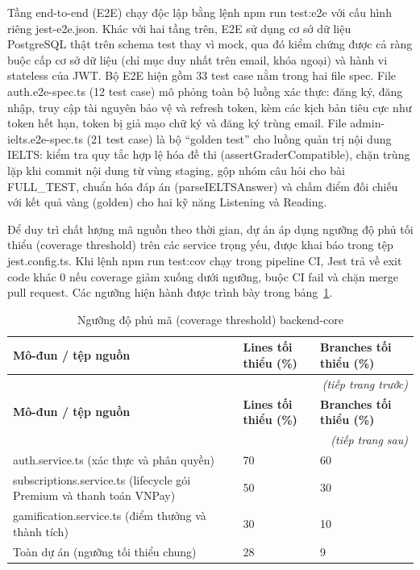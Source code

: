 Tầng end-to-end (E2E) chạy độc lập bằng lệnh npm run test:e2e với cấu hình riêng jest-e2e.json. Khác với hai tầng trên, E2E sử dụng cơ sở dữ liệu PostgreSQL thật trên schema test thay vì mock, qua đó kiểm chứng được cả ràng buộc cấp cơ sở dữ liệu (chỉ mục duy nhất trên email, khóa ngoại) và hành vi stateless của JWT. Bộ E2E hiện gồm 33 test case nằm trong hai file spec. File auth.e2e-spec.ts (12 test case) mô phỏng toàn bộ luồng xác thực: đăng ký, đăng nhập, truy cập tài nguyên bảo vệ và refresh token, kèm các kịch bản tiêu cực như token hết hạn, token bị giả mạo chữ ký và đăng ký trùng email. File admin-ielts.e2e-spec.ts (21 test case) là bộ ``golden test'' cho luồng quản trị nội dung IELTS: kiểm tra quy tắc hợp lệ hóa đề thi (assertGraderCompatible), chặn trùng lặp khi commit nội dung từ vùng staging, gộp nhóm câu hỏi cho bài FULL\_\allowbreak{}TEST, chuẩn hóa đáp án (parseIELTSAnswer) và chấm điểm đối chiếu với kết quả vàng (golden) cho hai kỹ năng Listening và Reading.

Để duy trì chất lượng mã nguồn theo thời gian, dự án áp dụng ngưỡng độ phủ tối thiểu (coverage threshold) trên các service trọng yếu, được khai báo trong tệp jest.config.ts. Khi lệnh npm run test:cov chạy trong pipeline CI, Jest trả về exit code khác 0 nếu coverage giảm xuống dưới ngưỡng, buộc CI fail và chặn merge pull request. Các ngưỡng hiện hành được trình bày trong bảng~\ref{tab:coverage_thresholds}.

\setlength{\tbu}{\dimexpr(\linewidth - 6\tabcolsep - 4\arrayrulewidth - 4pt)/100\relax}
\begin{longtable}{|p{50\tbu}|p{25\tbu}|p{25\tbu}|}
    \caption{Ngưỡng độ phủ mã (coverage threshold) backend-core}
    \label{tab:coverage_thresholds} \\
    \hline
    \textbf{Mô-đun / tệp nguồn} & \textbf{Lines tối thiểu (\%)} & \textbf{Branches tối thiểu (\%)} \\ \hline
    \endfirsthead
    \multicolumn{3}{r}{\textit{(tiếp trang trước)}} \\
    \hline
    \textbf{Mô-đun / tệp nguồn} & \textbf{Lines tối thiểu (\%)} & \textbf{Branches tối thiểu (\%)} \\ \hline
    \endhead
    \hline \multicolumn{3}{r}{\textit{(tiếp trang sau)}} \\
    \endfoot
    \hline
    \endlastfoot

    auth.service.ts (xác thực và phân quyền) & 70 & 60 \\ \hline
    subscriptions.service.ts (lifecycle gói Premium và thanh toán VNPay) & 50 & 30 \\ \hline
    gamification.service.ts (điểm thưởng và thành tích) & 30 & 10 \\ \hline
    Toàn dự án (ngưỡng tối thiểu chung) & 28 & 9 \\ \hline
\end{longtable}

